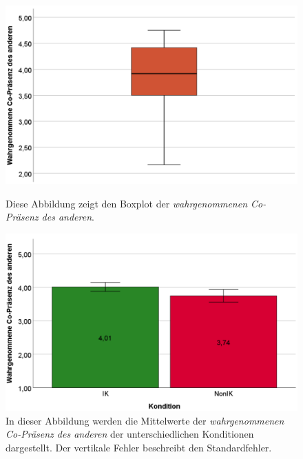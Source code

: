 \documentclass[a4paper,11pt]{article}%
\renewcommand{\\}{\vspace*{0.5\baselineskip} \newline}
\begin{document}
{{{{{{{{{{{{{{{{{{	\begin{figure}[H]
   \begin{minipage}[t]{.5\linewidth} %
      \includegraphics[width=\linewidth]{Abbildungen/AuswertungDiagramme/Final/BP_OtherCoPresence.png}
      \caption[Boxplot der selbst wahrgenommenen Co-Präsenz des anderen]{Diese Abbildung zeigt den Boxplot der \textit{wahrgenommenen Co-Präsenz des anderen}.}
            \label{SD_OtherCoPresenceBP}
   \end{minipage}
   \hspace{.02\linewidth}%
   \begin{minipage}[t]{.5\linewidth} %
     \includegraphics[width=\linewidth]{Abbildungen/AuswertungDiagramme/Final/SD_OtherCoPresence_Mittelwerte.png}
      \caption[Durchschnittliche wahrgenommene Co-Präsenz des anderen der Konditionen]{In dieser Abbildung werden die Mittelwerte der \textit{wahrgenommenen Co-Präsenz des anderen} der unterschiedlichen Konditionen dargestellt. Der vertikale Fehler beschreibt den Standardfehler.}
       \label{SD_SelbstCoPresence_Mittelwerte}
   \end{minipage}
\end{figure}

}}}}}}}}}}}}}}}}}}
\end{document}
